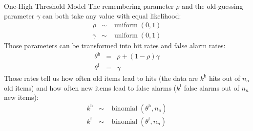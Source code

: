 \documentclass[10pt]{beamer}
\begin{document}
\begin{frame}[fragile]{One-High Threshold Model}
The remembering parameter $\rho$ and the old-guessing parameter $\gamma$ can both take any value with equal likelihood:
\begin{eqnarray}
\rho &\sim& \operatorname{uniform}\left(0, 1\right) \nonumber\\
\gamma &\sim&\operatorname{uniform}\left(0, 1\right) \nonumber
\end{eqnarray}\pause
Those parameters can be transformed into hit rates and false alarm rates:
\begin{eqnarray}
 \theta^\mathrm{h} &=& {\rho} + {\left(1-\rho\right)\gamma} \nonumber\\
 \theta^\mathrm{f} &=& {\gamma} \nonumber
\end{eqnarray}\pause
Those rates tell us how often old items lead to hits (the data are $k^\mathrm{h}$ hits out of $n_o$ old items) and how often new items lead to false alarms ($k^\mathrm{f}$ false alarms out of $n_n$ new items): 
\begin{eqnarray}
 k^\mathrm{h} &\sim& \operatorname{binomial}\left(\theta^\mathrm{h}, n_o\right) \nonumber\\
 k^\mathrm{f} &\sim& \operatorname{binomial}\left(\theta^\mathrm{f}, n_n\right) \nonumber
\end{eqnarray}

\end{frame}
\end{document}
